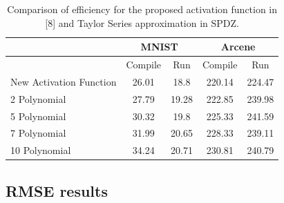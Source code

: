 \documentclass{article}
\begin{document}
\begin{table}[h]
\centering
\label{my-label}
\caption{Comparison of efficiency for the proposed activation function in [8] and Taylor Series approximation in SPDZ.}
\begin{tabular}{@{}lcccc@{}}
\toprule
                        & \multicolumn{2}{c}{MNIST} & \multicolumn{2}{c}{Arcene} \\ \midrule
                        & Compile      & Run        & Compile      & Run         \\
New Activation Function & 26.01        & 18.8       & 220.14       & 224.47      \\
2 Polynomial            & 27.79        & 19.28      & 222.85       & 239.98      \\
5 Polynomial            & 30.32        & 19.8       & 225.33       & 241.59      \\
7 Polynomial            & 31.99        & 20.65      & 228.33       & 239.11      \\
10 Polynomial           & 34.24        & 20.71      & 230.81       & 240.79      \\ \bottomrule
\end{tabular}
\label{tbl2}
\end{table}


\newpage
\subsection{RMSE results}
\end{document}
